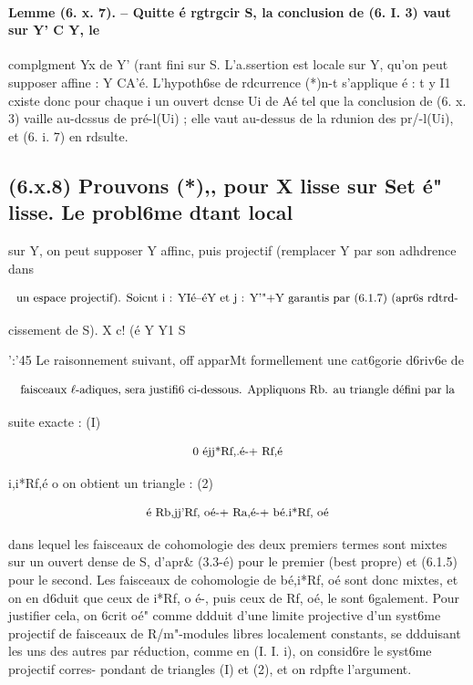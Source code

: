 \documentclass[11pt]{article}
\theoremstyle{remark}
\begin{document}
\paragraph{Lemme (6. x. 7). -- Quitte é rgtrgcir S, la conclusion de (6. I. 3) vaut sur Y' C Y, le}

complgment Yx de Y' (rant fini sur S. L'a.ssertion est locale sur Y, qu'on peut supposer affine : Y CA'é. L'hypoth6se de rdcurrence (*)n-t s'applique é : t y I1 cxiste donc pour chaque i un ouvert dcnse Ui de Aé tel que la conclusion de (6. x. 3) vaille au-dcssus de pré-l(Ui) ; elle vaut au-dessus de la rdunion des pr/-l(Ui), et (6. i. 7) en rdsulte.

\subsection*{(6.x.8) Prouvons (*),, pour X lisse sur Set é" lisse. Le probl6me dtant local}

sur Y, on peut supposer Y affinc, puis projectif (remplacer Y par son adhdrence dans

\[\text{\small un espace projectif). Soicnt i : YIé--éY et j : Y'"+Y garantis par (6.1.7) (apr6s rdtrd-}\]

cissement de S). X c! (é Y Y1 S

':'45 Le raisonnement suivant, off apparMt formellement une cat6gorie d6riv6e de

\[\text{\small faisceaux \(\ell\)-adiques, sera justifi6 ci-dessous. Appliquons Rb. au triangle défini par la}\]

suite exacte : (I)

\[\text{\small 0 éjj*Rf,.é-+ Rf,é}\]

i,i*Rf,é o on obtient un triangle : (2)

\[\text{\small é Rb,jj'Rf, oé-+ Ra,é-+ bé.i*Rf, oé}\]

dans lequel les faisceaux de cohomologie des deux premiers termes sont mixtes sur un ouvert dense de S, d'apr\& (3.3-é) pour le premier (best propre) et (6.1.5) pour le second. Les faisceaux de cohomologie de bé,i*Rf, oé sont donc mixtes, et on en d6duit que ceux de i*Rf, o é-, puis ceux de Rf, oé, le sont 6galement. Pour justifier cela, on 6crit oé" comme ddduit d'une limite projective d'un syst6me projectif de faisceaux de R/m"-modules libres localement constants, se ddduisant les uns des autres par réduction, comme en (I. I. i), on consid6re le syst6me projectif corres- pondant de triangles (I) et (2), et on rdpfte l'argument.
\end{document}
